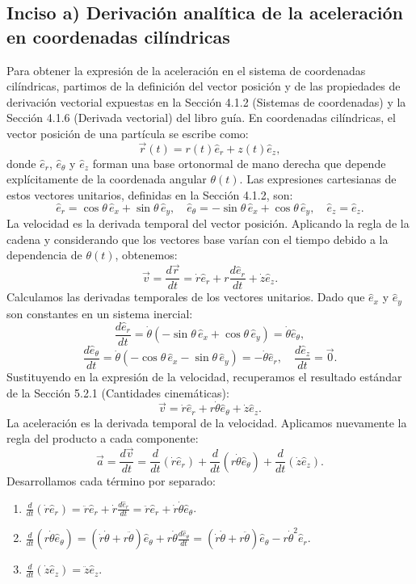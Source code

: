 \documentclass[12pt, a4paper]{article}
\begin{document}
\subsection*{Inciso a) Derivación analítica de la aceleración en coordenadas cilíndricas}
Para obtener la expresión de la aceleración en el sistema de coordenadas cilíndricas, partimos de la definición del vector posición y de las propiedades de derivación vectorial expuestas en la Sección 4.1.2 (Sistemas de coordenadas) y la Sección 4.1.6 (Derivada vectorial) del libro guía. En coordenadas cilíndricas, el vector posición de una partícula se escribe como:
$$
\vec{r}(t) = r(t) \hat{e}_r + z(t) \hat{e}_z,
$$
donde $\hat{e}_r$, $\hat{e}_\theta$ y $\hat{e}_z$ forman una base ortonormal de mano derecha que depende explícitamente de la coordenada angular $\theta(t)$. Las expresiones cartesianas de estos vectores unitarios, definidas en la Sección 4.1.2, son:
$$
\hat{e}_r = \cos\theta \, \hat{e}_x + \sin\theta \, \hat{e}_y, \quad
\hat{e}_\theta = -\sin\theta \, \hat{e}_x + \cos\theta \, \hat{e}_y, \quad
\hat{e}_z = \hat{e}_z.
$$
La velocidad es la derivada temporal del vector posición. Aplicando la regla de la cadena y considerando que los vectores base varían con el tiempo debido a la dependencia de $\theta(t)$, obtenemos:
$$
\vec{v} = \frac{d\vec{r}}{dt} = \dot{r} \hat{e}_r + r \frac{d\hat{e}_r}{dt} + \dot{z} \hat{e}_z.
$$
Calculamos las derivadas temporales de los vectores unitarios. Dado que $\hat{e}_x$ y $\hat{e}_y$ son constantes en un sistema inercial:
$$
\frac{d\hat{e}_r}{dt} = \dot{\theta}(-\sin\theta \, \hat{e}_x + \cos\theta \, \hat{e}_y) = \dot{\theta} \hat{e}_\theta,
$$
$$
\frac{d\hat{e}_\theta}{dt} = \dot{\theta}(-\cos\theta \, \hat{e}_x - \sin\theta \, \hat{e}_y) = -\dot{\theta} \hat{e}_r, \quad \frac{d\hat{e}_z}{dt} = \vec{0}.
$$
Sustituyendo en la expresión de la velocidad, recuperamos el resultado estándar de la Sección 5.2.1 (Cantidades cinemáticas):
$$
\vec{v} = \dot{r} \hat{e}_r + r\dot{\theta} \hat{e}_\theta + \dot{z} \hat{e}_z.
$$
La aceleración es la derivada temporal de la velocidad. Aplicamos nuevamente la regla del producto a cada componente:
$$
\vec{a} = \frac{d\vec{v}}{dt} = \frac{d}{dt}(\dot{r} \hat{e}_r) + \frac{d}{dt}(r\dot{\theta} \hat{e}_\theta) + \frac{d}{dt}(\dot{z} \hat{e}_z).
$$
Desarrollamos cada término por separado:
\begin{enumerate}
    \item $\frac{d}{dt}(\dot{r} \hat{e}_r) = \ddot{r} \hat{e}_r + \dot{r} \frac{d\hat{e}_r}{dt} = \ddot{r} \hat{e}_r + \dot{r}\dot{\theta} \hat{e}_\theta$.
    \item $\frac{d}{dt}(r\dot{\theta} \hat{e}_\theta) = (\dot{r}\dot{\theta} + r\ddot{\theta}) \hat{e}_\theta + r\dot{\theta} \frac{d\hat{e}_\theta}{dt} = (\dot{r}\dot{\theta} + r\ddot{\theta}) \hat{e}_\theta - r\dot{\theta}^2 \hat{e}_r$.
    \item $\frac{d}{dt}(\dot{z} \hat{e}_z) = \ddot{z} \hat{e}_z$.
\end{enumerate}
\end{document}
